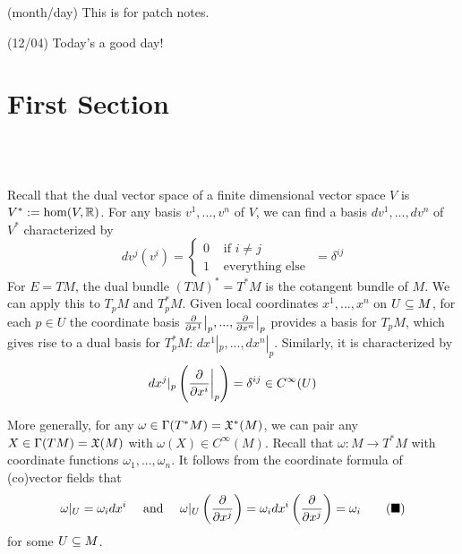\documentclass[10pt]{article}
\begin{document}
\def\habauthor{Abbreviation of your name(s)}
\def\hauthor{Full name(s)}
\hsetup
\htoc
\hmain

(month/day) This is for patch notes. 

(12/04) Today's a good day!

\newpage
\section*{First Section} 
\\\\
\begin{hdefinition}
    Recall that the dual vector space of a finite dimensional vector space $V$ is $V^*:= \hom(V, \mathbb{R})$. For any basis $v^1, ..., v^n$ of $V$, we can find a basis $dv^1, ..., dv^n$ of $V^*$ characterized by 
    $$
        dv^j(v^i) = 
        \begin{cases}
            0 & \text{ if } i\neq j \\
            1 & \text{ everything else } 
        \end{cases}
        =
        \delta^{ij} 
    $$
    For $E = TM$, the dual bundle $(TM)^* = T^*M$ is the cotangent bundle of $M$.
    We can apply this to $T_pM$ and $T^*_pM$. Given local coordinates $x^1,...,x^n$ on $U\subseteq M$, for each $p\in U$ the coordinate basis $\frac{\partial }{\partial x^1}\big|_p, ..., \frac{\partial }{\partial x^n}\big|_p$ provides a basis for $T_pM$, which gives rise to a dual basis for $T^*_pM$: $dx^1|_p,...,dx^n|_p$. Similarly, it is characterized by 
    $$
        dx^j|_p \left( \frac{\partial}{\partial x^i} \bigg|_p\right) = \delta^{ij} \in C^\infty(U)
    $$
    
\end{hdefinition}
\begin{remark}
    More generally, for any $\omega \in \Gamma(T^*M) = \mathfrak{X}^*(M)$, we can pair any $X\in \Gamma(TM) = \mathfrak{X}(M)$ with $\omega(X) \in C^\infty(M)$. Recall that $\omega: M\to T^*M$ with coordinate functions $\omega_1,..., \omega_n$. It follows from the coordinate formula of (co)vector fields that
    \begin{align*}
        \omega|_{U} = \omega_idx^i \quad \text{ and }\quad \omega|_{U} \left( \frac{\partial}{\partial x^j} \right) = \omega_idx^i\left( \frac{\partial}{\partial x^j} \right) = \omega_i \tag{$\blacksquare$}
    \end{align*}
    for some $U\subseteq M$.
\end{remark}
\end{document}
